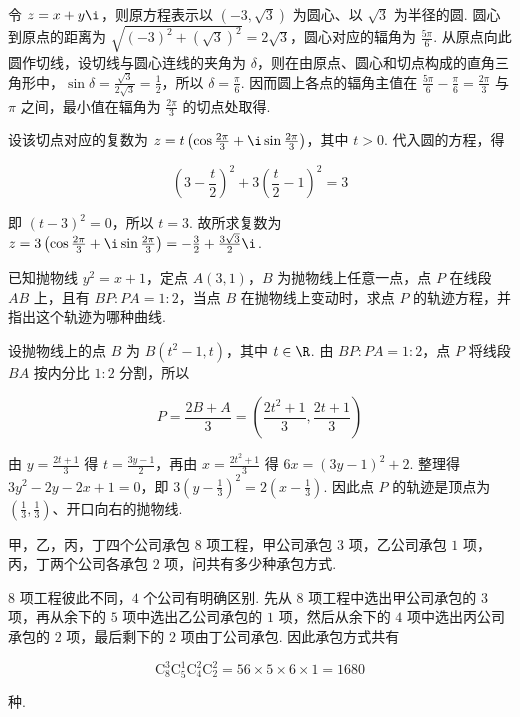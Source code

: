 \documentclass[UTF8,a4paper,oneside,11pt]{ctexbook}
\begin{document}
\begin{solution}
令 \(z=x+y\i\)，则原方程表示以 \((-3,\sqrt{3})\) 为圆心、以 \(\sqrt{3}\) 为半径的圆. 圆心到原点的距离为 \(\sqrt{(-3)^2+(\sqrt{3})^2}=2\sqrt{3}\)，圆心对应的辐角为 \(\frac{5\pi}{6}\). 从原点向此圆作切线，设切线与圆心连线的夹角为 \(\delta\)，则在由原点、圆心和切点构成的直角三角形中，\(\sin\delta=\frac{\sqrt{3}}{2\sqrt{3}}=\frac{1}{2}\)，所以 \(\delta=\frac{\pi}{6}\). 因而圆上各点的辐角主值在 \(\frac{5\pi}{6}-\frac{\pi}{6}=\frac{2\pi}{3}\) 与 \(\pi\) 之间，最小值在辐角为 \(\frac{2\pi}{3}\) 的切点处取得.

设该切点对应的复数为 \(z=t\left(\cos\frac{2\pi}{3}+\i\sin\frac{2\pi}{3}\right)\)，其中 \(t>0\). 代入圆的方程，得

\[
\left(3-\frac{t}{2}\right)^2+3\left(\frac{t}{2}-1\right)^2=3
\]

即 \((t-3)^2=0\)，所以 \(t=3\). 故所求复数为 \(z=3\left(\cos\frac{2\pi}{3}+\i\sin\frac{2\pi}{3}\right)=-\frac{3}{2}+\frac{3\sqrt{3}}{2}\i\).
\end{solution}

\begin{problem}
已知抛物线 \(y^2 = x + 1\)，定点 \(A(3,1)\)，\(B\) 为抛物线上任意一点，点 \(P\) 在线段 \(AB\) 上，且有 \(BP:PA = 1:2\)，当点 \(B\) 在抛物线上变动时，求点 \(P\) 的轨迹方程，并指出这个轨迹为哪种曲线.
\end{problem}

\begin{solution}
设抛物线上的点 \(B\) 为 \(B(t^2-1,t)\)，其中 \(t\in\R\). 由 \(BP:PA=1:2\)，点 \(P\) 将线段 \(BA\) 按内分比 \(1:2\) 分割，所以

\[
P=\frac{2B+A}{3}=\left(\frac{2t^2+1}{3},\frac{2t+1}{3}\right)
\]

由 \(y=\frac{2t+1}{3}\) 得 \(t=\frac{3y-1}{2}\)，再由 \(x=\frac{2t^2+1}{3}\) 得 \(6x=(3y-1)^2+2\). 整理得 \(3y^2-2y-2x+1=0\)，即 \(3\left(y-\frac{1}{3}\right)^2=2\left(x-\frac{1}{3}\right)\). 因此点 \(P\) 的轨迹是顶点为 \(\left(\frac{1}{3},\frac{1}{3}\right)\)、开口向右的抛物线.
\end{solution}

\begin{problem}
甲，乙，丙，丁四个公司承包 \(8\) 项工程，甲公司承包 \(3\) 项，乙公司承包 \(1\) 项，丙，丁两个公司各承包 \(2\) 项，问共有多少种承包方式.
\end{problem}

\begin{solution}
\(8\) 项工程彼此不同，\(4\) 个公司有明确区别. 先从 \(8\) 项工程中选出甲公司承包的 \(3\) 项，再从余下的 \(5\) 项中选出乙公司承包的 \(1\) 项，然后从余下的 \(4\) 项中选出丙公司承包的 \(2\) 项，最后剩下的 \(2\) 项由丁公司承包. 因此承包方式共有

\[
\mathrm C_8^3\mathrm C_5^1\mathrm C_4^2\mathrm C_2^2
=56\times5\times6\times1
=1680
\]

种.
\end{solution}
\end{document}
